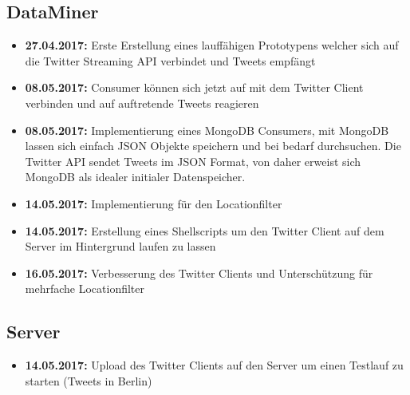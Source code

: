 \documentclass[12pt, 
	a4paper, 
	oneside, 
	leqno]{scrreprt}
\begin{document}
\subsection*{DataMiner}

\begin{itemize}
  \item \textbf{27.04.2017:} Erste Erstellung eines lauffähigen Prototypens welcher sich auf die Twitter Streaming API verbindet und Tweets empfängt
  \item \textbf{08.05.2017:} Consumer können sich jetzt auf mit dem Twitter Client verbinden und auf auftretende Tweets reagieren
  \item \textbf{08.05.2017:} Implementierung eines MongoDB Consumers, mit MongoDB lassen sich einfach JSON Objekte speichern und bei bedarf durchsuchen. Die Twitter API sendet Tweets im JSON Format, von daher erweist sich MongoDB als idealer initialer Datenspeicher.
  \item \textbf{14.05.2017:} Implementierung für den Locationfilter
  \item \textbf{14.05.2017:} Erstellung eines Shellscripts um den Twitter Client auf dem Server im Hintergrund laufen zu lassen
  \item \textbf{16.05.2017:} Verbesserung des Twitter Clients und Unterschützung für mehrfache Locationfilter
\end{itemize}

\subsection*{Server}

\begin{itemize}
  \item \textbf{14.05.2017:} Upload des Twitter Clients auf den Server um einen Testlauf zu starten (Tweets in Berlin)
\end{itemize}
\end{document}
